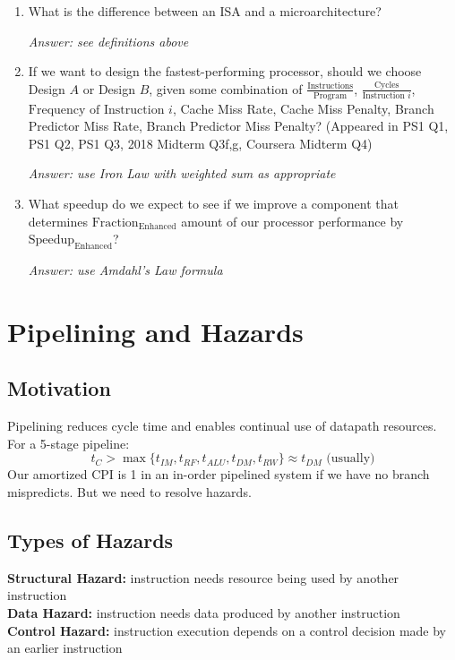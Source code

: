 \documentclass{article}
\begin{document}
\begin{enumerate}
\item What is the difference between an ISA and a microarchitecture?

\textit{Answer: see definitions above}

\item If we want to design the fastest-performing processor, should we choose Design $A$ or Design $B$, given some combination of $\frac{\text{Instructions}}{\text{Program}}$, $\frac{\text{Cycles}}{\text{Instruction } i}$, $\text{Frequency of Instruction } i$, Cache Miss Rate, Cache Miss Penalty, Branch Predictor Miss Rate, Branch Predictor Miss Penalty? (Appeared in PS1 Q1, PS1 Q2, PS1 Q3, 2018 Midterm Q3f,g, Coursera Midterm Q4)

\textit{Answer: use Iron Law with weighted sum as appropriate}

\item What speedup do we expect to see if we improve a component that determines $\text{Fraction}_{\text{Enhanced}}$ amount of our processor performance by $\text{Speedup}_{\text{Enhanced}}$?

\textit{Answer: use Amdahl's Law formula}
\end{enumerate}

\section{Pipelining and Hazards}

\subsection{Motivation}

Pipelining reduces cycle time and enables continual use of datapath resources. For a 5-stage pipeline:
$$ t_C > \max \lbrace t_{IM}, t_{RF}, t_{ALU}, t_{DM}, t_{RW} \rbrace \approx t_{DM} \text{ (usually)} $$
Our amortized CPI is 1 in an in-order pipelined system if we have no branch mispredicts. But we need to resolve hazards.

\subsection{Types of Hazards}

\textbf{Structural Hazard:} instruction needs resource being used by another instruction \\
\textbf{Data Hazard:} instruction needs data produced by another instruction \\
\textbf{Control Hazard:} instruction execution depends on a control decision made by an earlier instruction
\end{document}
